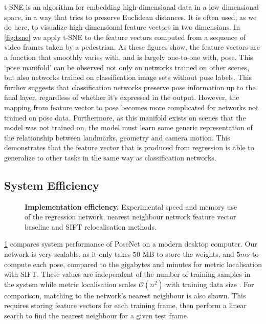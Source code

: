 t-SNE \citep{van2008visualizing} is an algorithm for embedding high-dimensional data in a low dimensional space, in a way that tries to preserve Euclidean distances. It is often used, as we do here, to visualize high-dimensional feature vectors in two dimensions. In \cref{fig:tsne} we apply t-SNE to the feature vectors computed from a sequence of video frames taken by a pedestrian. As these figures show, the feature vectors are a function that smoothly varies with, and is largely one-to-one with, pose. This `pose manifold' can be observed not only on networks trained on other scenes, but also networks trained on classification image sets without pose labels. This further suggests that classification networks preserve pose information up to the final layer, regardless of whether it's expressed in the output. However, the mapping from feature vector to pose becomes more complicated for networks not trained on pose data. Furthermore, as this manifold exists on scenes that the model was not trained on, the model must learn some generic representation of the relationship between landmarks, geometry and camera motion. This demonstrates that the feature vector that is produced from regression is able to generalize to other tasks in the same way as classification networks.

\subsection{System Efficiency}

\begin{figure}[t]
\makebox[\linewidth][c]{
   	}
   \caption[Implementation efficiency.]{\textbf{Implementation efficiency.} Experimental speed and memory use of the regression network, nearest neighbour network feature vector baseline and SIFT relocalisation methods.}
\label{fig:speed}
\end{figure}

\cref{fig:speed} compares system performance of PoseNet on a modern desktop computer. Our network is very scalable, as it only takes $50$ MB to store the weights, and $5ms$ to compute each pose, compared to the gigabytes and minutes for metric localisation with SIFT. These values are independent of the number of training samples in the system while metric localisation scales $\mathcal{O}(n^2)$ with training data size \citep{wu2013towards}. For comparison, matching to the network's nearest neighbour is also shown. This requires storing feature vectors for each training frame, then perform a linear search to find the nearest neighbour for a given test frame.

















